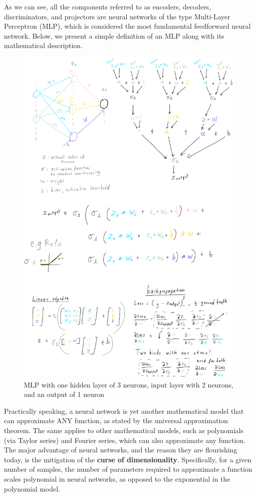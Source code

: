 \documentclass[12pt, a4paper]{article}
\begin{document}
As we can see, all the components referred to as encoders, decoders, discriminators, and projectors are neural networks of the type Multi-Layer Perceptron (MLP), which is considered the most fundamental feedforward neural network. Below, we present a simple definition of an MLP along with its mathematical description.

\begin{figure}[h!]
  \centering
  \includegraphics[width=.8\textwidth]{mlp.png}
  \caption{MLP with one hidden layer of 3 neurons, input layer with 2 neurons, and an output of 1 neuron}
\end{figure}

Practically speaking, a neural network is yet another mathematical model that can approximate ANY function, as stated by the universal approximation theorem. The same applies to other mathematical models, such as polynomials (via Taylor series) and Fourier series, which can also approximate any function. The major advantage of neural networks, and the reason they are flourishing today, is the mitigation of the \textbf{curse of dimensionality}. Specifically, for a given number of samples, the number of parameters required to approximate a function scales polynomial in neural networks, as opposed to the exponential in the polynomial model.
\end{document}
